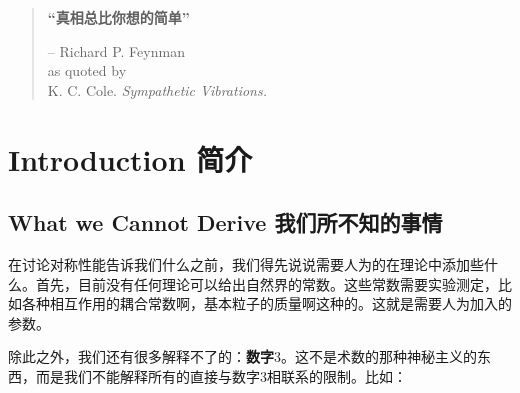 

\begin{quote}%
{\bf “真相总比你想的简单”}


\begin{flushright}
-- Richard P. Feynman\\
as quoted by\\
K. C. Cole. {\it Sympathetic Vibrations.}
\end{flushright}
\end{quote}




\chapter[简介]{Introduction 简介}\label{chap1}

\section[我们所不知的事情]{What we Cannot Derive 我们所不知的事情}\label{sec1.1}

在讨论对称性能告诉我们什么之前，我们得先说说需要人为的在理论中添加些什么。首先，目前没有任何理论可以给出自然界的常数。这些常数需要实验测定，比如各种相互作用的耦合常数啊，基本粒子的质量啊这种的。这就是需要人为加入的参数。

除此之外，我们还有很多解释不了的：{\bf 数字$3$}。这不是术数的那种神秘主义的东西，而是我们不能解释所有的直接与数字$3$相联系的限制。比如：

